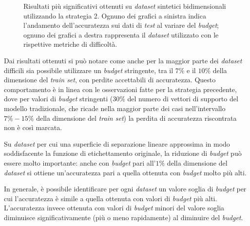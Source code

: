 \begin{figure}[ht]
\begin{subfigure}{\textwidth}
    \end{subfigure}%
\caption[Risultati su \emph{dataset} sintetici utilizzando la strategia 2.]{Risultati più significativi ottenuti su \emph{dataset} sintetici bidimensionali utilizzando la strategia 2. Ognuno dei grafici a sinistra indica l'andamento dell'accuratezza sui dati di \emph{test} al variare del \emph{budget}; ognuno dei grafici a destra rappresenta il \emph{dataset} utilizzato con le rispettive metriche di difficoltà.}
\label{fig:2d_v2}
\end{figure}
Dai risultati ottenuti si può notare come anche per la maggior parte dei \emph{dataset} difficili sia possibile utilizzare un \emph{budget} stringente, tra il $7\%$ e il $10\%$ della dimensione del \emph{train set}, con perdite accettabili di accuratezza.
Questo comportamento è in linea con le osservazioni fatte per la strategia precedente, dove per valori di \emph{budget} stringenti ($30\%$ del numero di vettori di supporto del modello tradizionale, che ricade nella maggior parte dei casi nell'intervallo $7\%-15\%$ della dimensione del \emph{train set}) la perdita di accuratezza riscontrata non è così marcata.

Su \emph{dataset} per cui una superficie di separazione lineare approssima in modo soddisfacente la funzione di etichettamento originale, la riduzione di \emph{budget} può essere molto importante: anche con \emph{budget} pari all'$1\%$ della dimensione del \emph{dataset} si ottiene un'accuratezza pari a quella ottenuta con \emph{budget} molto più alti.

In generale, è possibile identificare per ogni \emph{dataset} un valore soglia di \emph{budget} per cui l'accuratezza è simile a quella ottenuta con valori di \emph{budget} più alti. 
L'accuratezza invece ottenuta con valori di \emph{budget} minori del valore soglia diminuisce significativamente (più o meno rapidamente) al diminuire del \emph{budget}.


